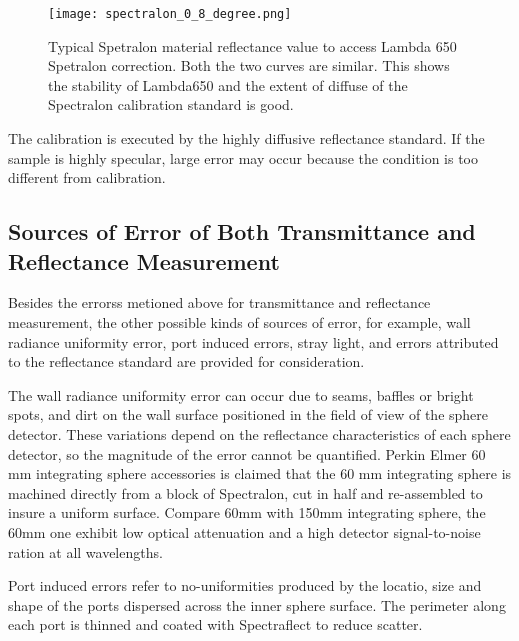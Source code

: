 \begin{figure}
    \centering
    \texttt{[image: spectralon\_0\_8\_degree.png]}
    \caption[Typical Spetralon material reflectance value to access Lambda 650 Spetralon correction]{Typical Spetralon material reflectance value to access Lambda 650 Spetralon correction. Both the two curves are similar. This shows the stability of Lambda650 and the extent of diffuse of the Spectralon calibration standard is good.}
    \label{fig:spectralon_0_8_degree.png}
    \end{figure}


The calibration is executed by the highly diffusive reflectance standard.
If the sample is highly specular, large error may occur because the condition is too different from calibration.


\subsection{Sources of Error of Both Transmittance and Reflectance Measurement}

Besides the errorss metioned above for transmittance and reflectance measurement, the other possible kinds of sources of error, for example,
wall radiance uniformity error, port induced errors, stray light, and errors attributed to the reflectance standard are provided
for consideration.

The wall radiance uniformity error can occur due to seams, baffles or bright spots, and dirt on the wall surface
positioned in the field of view of the sphere detector. These variations depend on the reflectance
characteristics of each sphere detector, so the magnitude of the error cannot be quantified.
Perkin Elmer 60 mm integrating sphere accessories is claimed that the 60 mm integrating sphere is machined
directly from a block of Spectralon, cut in half and
re-assembled to insure a uniform surface. Compare 60mm with 150mm integrating sphere, the 60mm one exhibit low optical
attenuation and a high detector signal-to-noise ration at all wavelengths.

Port induced errors refer to no-uniformities produced by the locatio, size and shape
of the ports dispersed across the inner sphere surface. The perimeter along each
port is thinned and coated with Spectraflect to reduce scatter.

